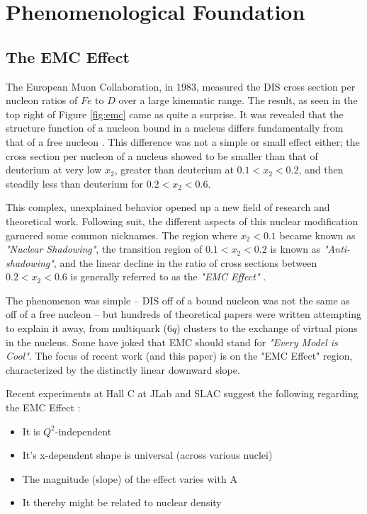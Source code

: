\documentclass[11pt]{article}
\begin{document}
\section{Phenomenological Foundation}
\subsection{The EMC Effect}

The European Muon Collaboration, in 1983, measured the DIS cross section per nucleon ratios of $Fe$ to $D$ over a large kinematic range.  The result, as seen in the top right of Figure \ref{fig:emc} came as quite a surprise.  It was revealed that the structure function of a nucleon bound in a nucleus differs fundamentally from that of a free nucleon  \cite{Aubert:1983xm}.  This difference was not a simple or small effect either; the cross section per nucleon of a nucleus showed to be smaller than that of deuterium at very low $x_2$, greater than deuterium at $0.1<x_2<0.2$, and then steadily less than deuterium for $0.2<x_2<0.6$. 

This complex, unexplained behavior opened up a new field of research and theoretical work. Following suit, the different aspects of this nuclear modification garnered some common nicknames.  The region where $x_2<0.1$ became known as \emph{"Nuclear Shadowing"}, the transition region of $0.1<x_2<0.2$ is known as \emph{"Anti-shadowing"}, and the linear decline in the ratio of cross sections between $0.2<x_2<0.6$ is generally referred to as the \emph{"EMC Effect"} \cite{Geesaman:1995yd}.

The phenomenon was simple -- DIS off of a bound nucleon was not the same as off of a free nucleon -- but hundreds of theoretical papers were written attempting to explain it away, from multiquark ($6q$) clusters to the exchange of virtual pions in the nucleus. Some have joked that EMC should stand for \emph{"Every Model is Cool"}. The focus of recent work (and this paper) is on the "EMC Effect" region, characterized by the distinctly linear downward slope.

Recent experiments at Hall C at JLab and SLAC suggest the following regarding the EMC Effect \cite{Seely:2009gt}:
\begin{itemize}
\item
It is $Q^2$-independent
\item
It's x-dependent shape is universal (across various nuclei)
\item
The magnitude (slope) of the effect varies with A
\item
It thereby might be related to nuclear density
\end{itemize}
\end{document}

